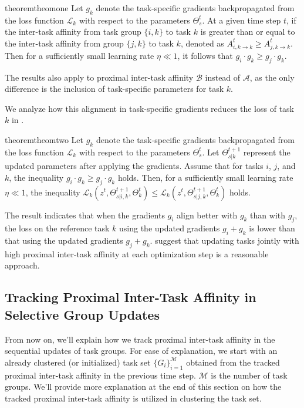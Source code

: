 \begin{restatable}[]{theorem}{theomone}
\label{theorem1}
Let $g_k$ denote the task-specific gradients backpropagated from the loss function $\mathcal{L}_k$ with respect to the parameters $\Theta_s^t$. At a given time step $t$, if the inter-task affinity from task group $\{i, k\}$ to task $k$ is greater than or equal to the inter-task affinity from group $\{j, k\}$ to task $k$, denoted as $A_{i,k \rightarrow k}^t \geq A_{j,k \rightarrow k}^t$. Then for a sufficiently small learning rate $\eta \ll 1$, it follows that $g_i \cdot g_k \geq g_j \cdot g_k$.
\end{restatable}
The results also apply to proximal inter-task affinity $\mathcal{B}$ instead of $\mathcal{A}$, as the only difference is the inclusion of task-specific parameters for task $k$.


We analyze how this alignment in task-specific gradients reduces the loss of task $k$ in .
\begin{restatable}[]{theorem}{theomtwo}
\label{theorem2}
Let $g_k$ denote the task-specific gradients backpropagated from the loss function $\mathcal{L}_k$ with respect to the parameters $\Theta_s^t$. Let $\Theta_{s|k}^{t+1}$ represent the updated parameters after applying the gradients. Assume that for tasks $i$, $j$, and $k$, the inequality $g_i \cdot g_k \geq g_j \cdot g_k$ holds. Then, for a sufficiently small learning rate $\eta \ll 1$, the inequality  $\mathcal{L}_k (z^t, \Theta_{s|i,k}^{t+1}, \Theta_k^t) \leq \mathcal{L}_k (z^t, \Theta_{s|j,k}^{t+1}, \Theta_k^t)$ holds.
\end{restatable}
The result indicates that when the gradients $g_i$ align better with $g_k$ than with $g_j$, the loss on the reference task $k$ using the updated gradients $g_i + g_k$ is lower than that using the updated gradients $g_j + g_k$.  suggest that updating tasks jointly with high proximal inter-task affinity at each optimization step is a reasonable approach.


\subsection{Tracking Proximal Inter-Task Affinity in Selective Group Updates}
From now on, we'll explain how we track proximal inter-task affinity in the sequential updates of task groups. For ease of explanation, we start with an already clustered (or initialized) task set $\{G_i\}_{i=1}^{\mathcal{M}}$ obtained from the tracked proximal inter-task affinity in the previous time step. $\mathcal{M}$ is the number of task groups. We'll provide more explanation at the end of this section on how the tracked proximal inter-task affinity is utilized in clustering the task set.

